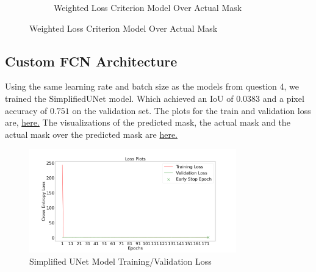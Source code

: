 \documentclass{article}
\begin{document}
\begin{figure}[h!]
\begin{subfigure}[b]{0.45\textwidth}
      \caption{Weighted Loss Criterion Model Over Actual Mask}
      \label{fig:weight_imbalanced_over_actual}
  \end{subfigure}
  \label{fig:weight_imbalanced_masks_visualization}
\end{figure}

\subsection{Custom FCN Architecture}
Using the same learning rate and batch size as the models from question 4, we trained the SimplifiedUNet model. Which achieved an IoU of $0.0383$ and a pixel accuracy of $0.751$ on the validation set. The plots for the train and validation loss are, \hyperref[fig:simplified_unet_train_loss]{here.} The visualizations of the predicted mask, the actual mask and the actual mask over the predicted mask are \hyperref[fig:simplified_unet_masks_visualization]{here.}

\begin{figure}[h!]
  \centering
  \includegraphics[width=0.8\textwidth]{include/plots/train_5_a_loss.png}
  \caption{Simplified UNet Model Training/Validation Loss}
  \label{fig:simplified_unet_train_loss}
\end{figure}
\end{document}
